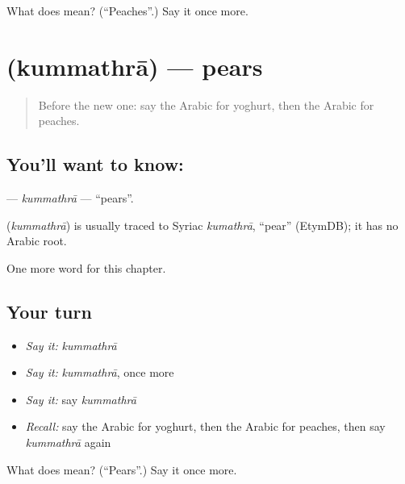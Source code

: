 \begin{tcolorbox}[breakable,colback=teal!4,colframe=teal!35!black,title={Before you move on}]
What does  mean? (\textquotedblleft{}Peaches\textquotedblright{}.) Say it once more.
\end{tcolorbox}
\section[\texorpdfstring{\ar{كمثرى} (kummathrā)}{كمثرى (kummathrā)}]{ (kummathrā) — pears}

\label{lesson:AR-C244-kummathra}



\begin{quote}
Before the new one: say the Arabic for yoghurt, then the Arabic for peaches.
\end{quote}

\subsection*{You'll want to know: }
\textbf{} — \emph{kummathrā} — \textquotedblleft{}pears\textquotedblright{}.

\begin{cousinweb}
\textbf{} (\emph{kummathrā}) is usually traced to Syriac \emph{kumathrā}, \textquotedblleft{}pear\textquotedblright{} (EtymDB); it has no Arabic root.
\end{cousinweb}

\begin{grammarlens}[title={What you've built}]
One more word for this chapter.
\end{grammarlens}

\subsection*{Your turn}
\begin{itemize}
\raggedright
  \item \emph{Say it:} \emph{kummathrā}
  \item \emph{Say it:} \emph{kummathrā}, once more
  \item \emph{Say it:} say \emph{kummathrā}
  \item \emph{Recall:} say the Arabic for yoghurt, then the Arabic for peaches, then say \emph{kummathrā} again
\end{itemize}

\begin{tcolorbox}[breakable,colback=teal!4,colframe=teal!35!black,title={Before you move on}]
What does  mean? (\textquotedblleft{}Pears\textquotedblright{}.) Say it once more.
\end{tcolorbox}
